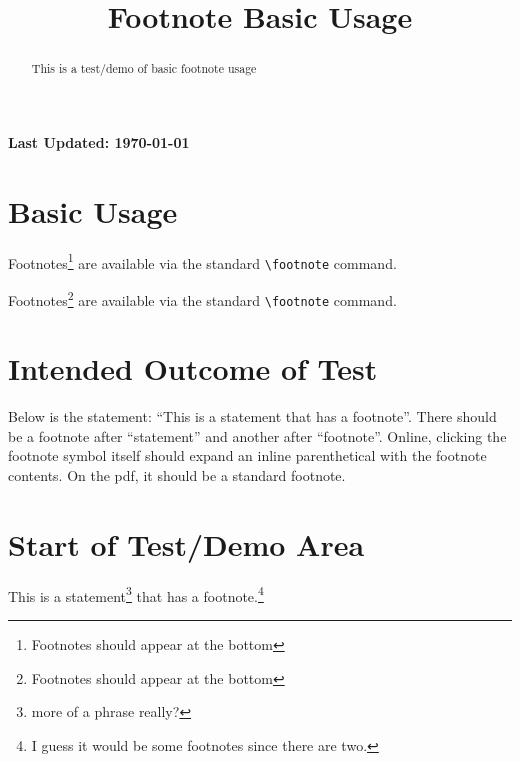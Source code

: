\documentclass{ximera}
\title{Footnote Basic Usage}
\begin{document}
\begin{abstract}
    This is a test/demo of basic footnote usage
\end{abstract}
\maketitle

{{\Huge \bfseries Last Updated: \today}} \\

\section{Basic Usage}
Footnotes\footnote{Footnotes should appear at the bottom} are available via the standard \verb|\footnote| command.


Footnotes\footnote{Footnotes should appear at the bottom} are available via the standard \verb|\footnote| command.

\section{Intended Outcome of Test}
Below is the statement: ``This is a statement that has a footnote''. There should be a footnote after ``statement'' and another after ``footnote''.
Online, clicking the footnote symbol itself should expand an inline parenthetical with the footnote contents. On the pdf, it should be 
a standard footnote.

\section{Start of Test/Demo Area}
This is a statement\footnote{more of a phrase really?} that has a footnote.\footnote{I guess it would be some footnotes since there are two.}

\hrulefill
\end{document}

